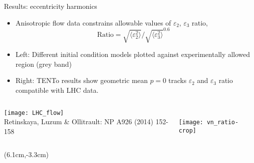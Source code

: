 \documentclass[svgnames]{beamer}
\newcommand{\trento}{T\raisebox{-.5ex}{R}ENTo}
\begin{document}
\begin{frame}{Results: eccentricity harmonics}
 \centering
 \begin{itemize}
  \item Anisotropic flow data constrains allowable values of $\varepsilon_2$, $\varepsilon_3$ ratio,
  \begin{equation*} 
    \text{Ratio} = \sqrt{\langle \varepsilon_2^2 \rangle} / \sqrt{\langle \varepsilon_3^2 \rangle}^{0.6}
  \end{equation*}
  
  \item Left: Different initial condition models plotted against experimentally allowed region (grey band)
  \vspace{0.05 in}
  \item Right: {\trento} results show geometric mean $p=0$ tracks 
        $\varepsilon_2$ and $\varepsilon_3$ ratio compatible with LHC data.
 \end{itemize}
 \begin{columns}
  \begin{column}{0.5\textwidth}
   \centering
   \texttt{[image: LHC\_flow]} \\
   \centering \tiny Retinskaya, Luzum \& Ollitrault: NP A926 (2014) 152-158
  \end{column}
  \begin{column}{0.5\textwidth}
   \centering
   \vspace{-0.05 in}\\
   \texttt{[image: vn\_ratio-crop]}
  \end{column}
 \end{columns}

 \begin{textblock*}{0.05\textwidth}(6.1cm,-3.3cm)
  \tiny {}
 \end{textblock*}
 
\end{frame}
\end{document}
